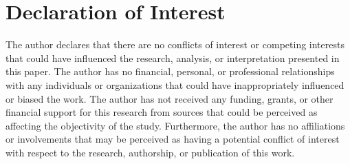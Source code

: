 \documentclass[12pt, a4paper]{article}
\begin{document}
\section*{Declaration of Interest}
The author declares that there are no conflicts of interest or competing interests that could have influenced the research, analysis, or interpretation presented in this paper. The author has no financial, personal, or professional relationships with any individuals or organizations that could have inappropriately influenced or biased the work. The author has not received any funding, grants, or other financial support for this research from sources that could be perceived as affecting the objectivity of the study. Furthermore, the author has no affiliations or involvements that may be perceived as having a potential conflict of interest with respect to the research, authorship, or publication of this work.
\end{document}
